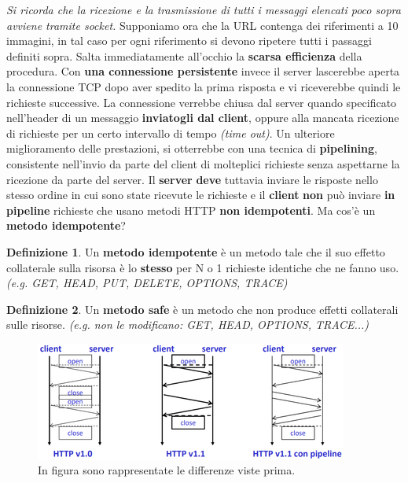 \documentclass[11pt,a4paper]{article}
\theoremstyle{definition}
\newtheorem{definition}{Definizione}[section]
\begin{document}
\textit{Si ricorda che la ricezione e la trasmissione di tutti i messaggi elencati poco sopra avviene tramite socket.}\newline
Supponiamo ora che la URL contenga dei riferimenti a 10 immagini, in tal caso per ogni riferimento si devono ripetere tutti i passaggi definiti sopra. Salta immediatamente all'occhio la \textbf{scarsa efficienza} della procedura.\newline\newline
Con \textbf{una connessione persistente} invece il server lascerebbe aperta la connessione TCP dopo aver spedito la prima risposta e vi riceverebbe quindi le richieste successive. La connessione verrebbe chiusa dal server quando specificato nell’header di un messaggio  \textbf{inviatogli dal client}, oppure alla mancata ricezione di richieste per un certo intervallo di tempo \textit{(time out)}.\newline\newline
Un ulteriore miglioramento delle prestazioni, si otterrebbe con una tecnica di \textbf{pipelining}, consistente nell’invio da parte del client di molteplici richieste senza aspettarne la ricezione da parte del server.\newline
Il \textbf{server} \textbf{deve} tuttavia inviare le risposte nello stesso ordine in cui sono state ricevute le richieste e il \textbf{client} \textbf{non} può inviare \textbf{in pipeline} richieste che usano metodi HTTP \textbf{non idempotenti}. Ma cos'è un \textbf{metodo idempotente}?
\theoremstyle{definition}
\begin{definition}
	Un \textbf{metodo idempotente} è un metodo tale che il suo effetto collaterale sulla risorsa è lo \textbf{stesso} per N o 1 richieste identiche che ne fanno uso. \textit{(e.g. GET, HEAD, PUT, DELETE, OPTIONS, TRACE)}
\end{definition}
\theoremstyle{definition}
\begin{definition}
	Un \textbf{metodo safe} è un metodo che non produce effetti collaterali sulle risorse. \textit{(e.g. non le modificano: GET, HEAD, OPTIONS, TRACE...)}
\end{definition}
\begin{figure}[!h]
	\includegraphics[scale=0.4]{Immagini/Http_vs.png}
	\centering
	\caption{In figura sono rappresentate le differenze viste prima.}
\end{figure}
\end{document}
